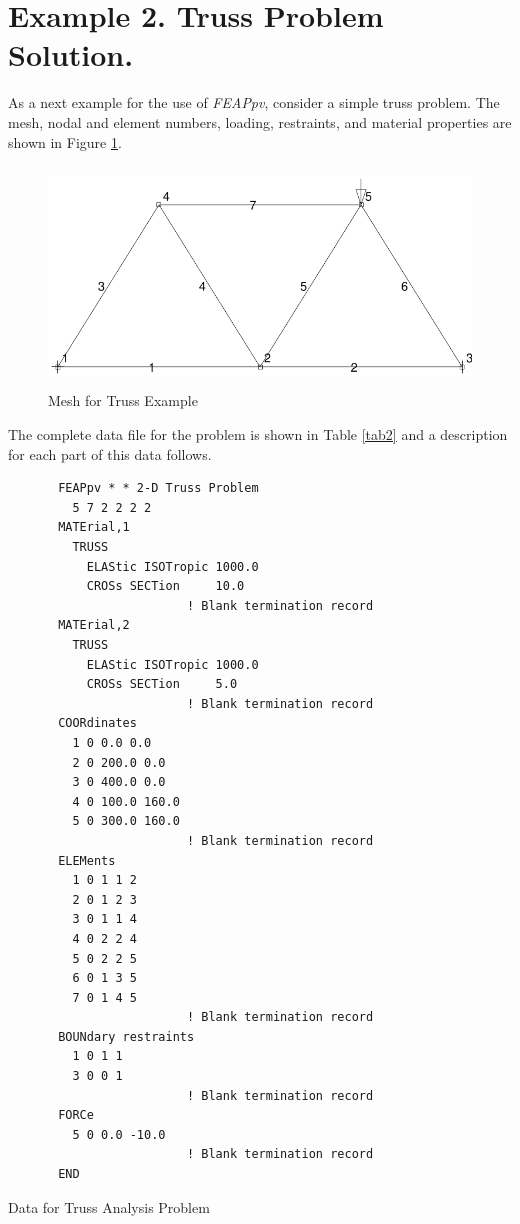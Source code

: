 \section{Example 2.  Truss Problem Solution.}
\label{ex2}

As a next example for the use of {\sl FEAPpv}, consider a simple truss problem.
The mesh, nodal and element numbers, loading, restraints, and material
properties are shown in Figure \ref{fig2}.

\begin{figure}[ht!]
\centerline {\hfil \includegraphics[height=2.3in]{figs/truss4} \hfil}
\caption{Mesh for Truss Example}
\label{fig2}
\end{figure}
The complete data file for the problem is shown in Table \ref{tab2} and a 
description for each part of this data follows.

\begin{table}
\begin{verbatim}
       FEAPpv * * 2-D Truss Problem
         5 7 2 2 2 2
       MATErial,1
         TRUSS
           ELAStic ISOTropic 1000.0
           CROSs SECTion     10.0
                         ! Blank termination record
       MATErial,2
         TRUSS
           ELAStic ISOTropic 1000.0
           CROSs SECTion     5.0
                         ! Blank termination record
       COORdinates
         1 0 0.0 0.0
         2 0 200.0 0.0
         3 0 400.0 0.0
         4 0 100.0 160.0
         5 0 300.0 160.0
                         ! Blank termination record
       ELEMents
         1 0 1 1 2
         2 0 1 2 3
         3 0 1 1 4
         4 0 2 2 4
         5 0 2 2 5
         6 0 1 3 5
         7 0 1 4 5
                         ! Blank termination record
       BOUNdary restraints
         1 0 1 1
         3 0 0 1
                         ! Blank termination record
       FORCe
         5 0 0.0 -10.0
                         ! Blank termination record
       END
\end{verbatim}
\caption{Data for Truss Analysis Problem}
\label{tab2}
\end{table}


